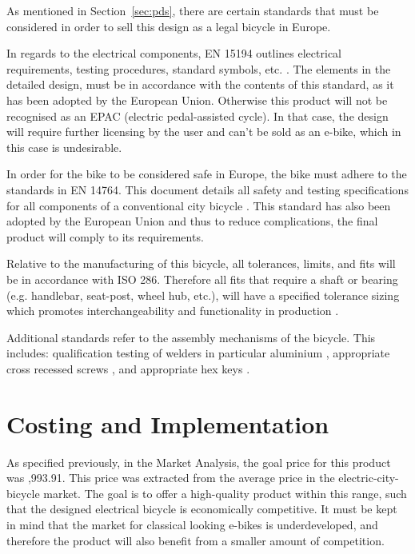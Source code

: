 \documentclass[a4paper,11pt]{article}
\begin{document}
As mentioned in Section~\ref{sec:pds}, there are certain standards that must be considered in order to sell this design as a legal bicycle in Europe.

In regards to the electrical components, EN 15194 outlines electrical requirements, testing procedures, standard symbols, etc. \cite{15194}. The elements in the detailed design, must be in accordance with the contents of this standard, as it has been adopted by the European Union. Otherwise this product will not be recognised as an EPAC (electric pedal-assisted cycle). In that case, the design will require further licensing by the user and can't be sold as an e-bike, which in this case is undesirable.

In order for the bike to be considered safe in Europe, the bike must adhere to the standards in EN 14764. This document details all safety and testing specifications for all components of a conventional city bicycle \cite{14764}. This standard has also been adopted by the European Union and thus to reduce complications, the final product will comply to its requirements.

Relative to the manufacturing of this bicycle, all tolerances, limits, and fits will be in accordance with ISO 286. Therefore all fits that require a shaft or bearing (e.g. handlebar, seat-post, wheel hub, etc.), will have a specified tolerance sizing which promotes interchangeability and functionality in production \cite{286}.

Additional standards refer to the assembly mechanisms of the bicycle. This includes: qualification testing of welders in particular aluminium \cite{9606}, appropriate cross recessed screws \cite{4757}, and appropriate hex keys \cite{4762}.

\section{Costing and Implementation}
\label{sec:coim}

As specified previously, in the Market Analysis, the goal price for this product was ,993.91. This price was extracted from the average price in the electric-city-bicycle market. The goal is to offer a high-quality product within this range, such that the designed electrical bicycle is economically competitive. It must be kept in mind that the market for classical looking e-bikes is underdeveloped, and therefore the product will also benefit from a smaller amount of competition.  
\end{document}
